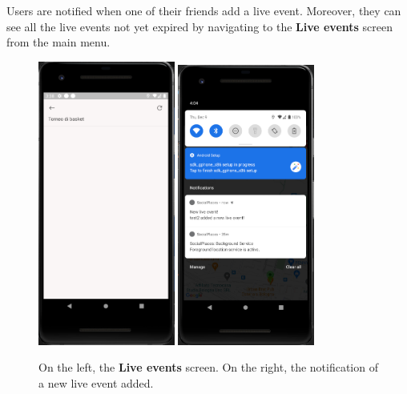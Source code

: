 \documentclass[../../main]{subfiles}
\begin{document}
\noindent
Users are notified when one of their friends add a live event.
Moreover, they can see all the live events not yet expired by navigating to the \textbf{Live events} screen from the main menu.
\begin{figure}[H]
    \centering
    \includegraphics[width=0.4\textwidth]{images/app/live/live_overview}
    \includegraphics[width=0.4\textwidth]{images/app/notification/live/notifed_live}
    \caption{On the left, the \textbf{Live events} screen. On the right, the notification of a new live event added.}
\end{figure}
\end{document}
